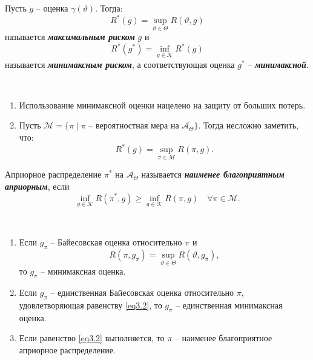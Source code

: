 \begin{defn}
	Пусть $g$ -- оценка $\gamma(\vartheta)$. Тогда:
	\[ R^*(g)=\sup_{\vartheta \in \Theta} R(\vartheta, g) \]
	называется \textbf{\textit{максимальным риском}} $g$ и
	\[ R^*(g^*)= \inf_{g \in \mathcal{K}} R^*(g) \]
	называется \textbf{\textit{минимаксным риском}}, а соответствующая оценка $g^*$ -- \textbf{\textit{минимаксной}}.
\end{defn}

\begin{rmrk} \
	\begin{enumerate}
		\item Использование минимаксной оценки нацелено на защиту от больших потерь.
		\item Пусть $\mathcal{M} = \{ \pi \mid \pi \text{ -- вероятностная мера на } \mathcal{A}_\Theta \}$. Тогда несложно заметить, что:
		\[ R^*(g)=\sup_{\pi \in \mathcal{M}} R(\pi, g). \]
	\end{enumerate}
\end{rmrk}

\begin{defn}
	Априорное распределение $\pi^*$ на $\mathcal{A}_\Theta$ называется \textbf{\textit{наименее благоприятным априорным}}, если
	\[ \inf_{g \in \mathcal{K}} R(\pi^*, g) \geq \inf_{g \in \mathcal{K}} R(\pi, g) \quad \forall \pi \in \mathcal{M}. \]
\end{defn}

\begin{thm} \
	\begin{enumerate}
		\item Если $g_\pi$ -- Байесовская оценка относительно $\pi$ и 
		\begin{equation} \label{eq3.2}
		 R(\pi, g_\pi) = \sup_{\vartheta \in \Theta} R(\vartheta, g_\pi),
		\end{equation}
		то $g_\pi$ -- минимаксная оценка.
		\item Если $g_\pi$ -- единственная Байесовская оценка относительно $\pi$, удовлетворяющая равенству \eqref{eq3.2}, то $g_\pi$ -- единственная минимаксная оценка.
		\item Если равенство \eqref{eq3.2} выполняется, то $\pi$ -- наименее благоприятное априорное распределение.
	\end{enumerate}
\end{thm}

